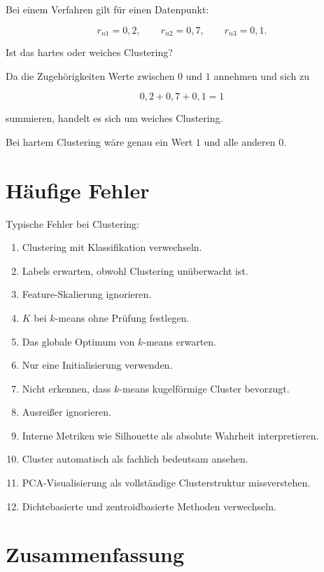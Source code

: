 Bei einem Verfahren gilt für einen Datenpunkt:

\[
    r_{n1}=0{,}2,
    \qquad
    r_{n2}=0{,}7,
    \qquad
    r_{n3}=0{,}1.
\]

Ist das hartes oder weiches Clustering?

\begin{examplebox}
Da die Zugehörigkeiten Werte zwischen \(0\) und \(1\) annehmen und sich zu

\[
    0{,}2+0{,}7+0{,}1=1
\]

summieren, handelt es sich um weiches Clustering.

Bei hartem Clustering wäre genau ein Wert \(1\) und alle anderen \(0\).
\end{examplebox}

\section{Häufige Fehler}

\begin{examtipbox}
Typische Fehler bei Clustering:

\begin{enumerate}
    \item Clustering mit Klassifikation verwechseln.
    \item Labels erwarten, obwohl Clustering unüberwacht ist.
    \item Feature-Skalierung ignorieren.
    \item \(K\) bei \(k\)-means ohne Prüfung festlegen.
    \item Das globale Optimum von \(k\)-means erwarten.
    \item Nur eine Initialisierung verwenden.
    \item Nicht erkennen, dass \(k\)-means kugelförmige Cluster bevorzugt.
    \item Ausreißer ignorieren.
    \item Interne Metriken wie Silhouette als absolute Wahrheit interpretieren.
    \item Cluster automatisch als fachlich bedeutsam ansehen.
    \item PCA-Visualisierung als vollständige Clusterstruktur missverstehen.
    \item Dichtebasierte und zentroidbasierte Methoden verwechseln.
\end{enumerate}
\end{examtipbox}

\section{Zusammenfassung}

